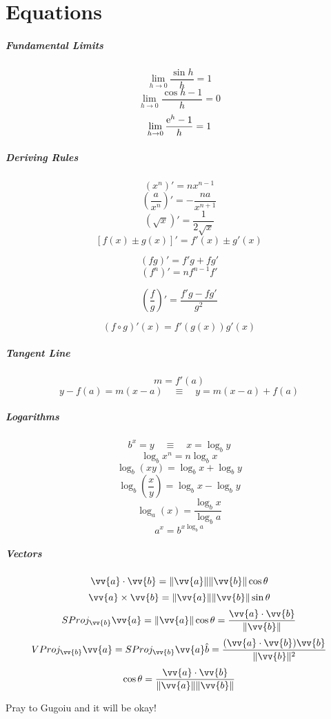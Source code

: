 \chapter{Equations}
	\paragraph{Fundamental Limits}
		\[\lim_{h \to 0} \frac{\sin h}{h} = 1\]
		\[\lim_{h \to 0} \frac{\cos h - 1}{h} = 0\]
		\[\lim_{h \to 0} \frac{\mathrm{e}^h - 1}{h} = 1\]
	\paragraph{Deriving Rules}
		\[(x^n)' = nx^{n-1}\]
		\[\left(\frac{a}{x^n}\right)' = -\frac{na}{x^{n+1}}\]
		\[(\sqrt{x})' = \frac{1}{2\sqrt{x}}\]
		\[[f(x) \pm g(x)]' = f'(x) \pm g'(x)\]

		\[(fg)' = f'g + fg'\]
		\[(f^n)' = nf^{n-1}f'\]

		\[\left(\frac{f}{g}\right)' = \frac{f'g - fg'}{g^2}\]

		\[(f \circ g)'(x) = f'(g(x))g'(x)\]
	\paragraph{Tangent Line}
		\[m = f'(a)\]
		\[y - f(a) = m(x-a) \quad \equiv \quad y = m(x-a) + f(a)\]
	\paragraph{Logarithms}
		\[b^x = y \quad \equiv \quad x = \log_b y\]
		\[\log_b x^n = n\log_b x\]
		\[\log_b(xy) = \log_b x + \log_b y\]
		\[\log_b\left(\frac{x}{y}\right) = \log_b x - \log_b y\]
		\[\log_a(x) = \frac{\log_b x}{\log_b a}\]
		\[a^x = b^{x\log_b a}\]
	\paragraph{Vectors}
		\[\vv{a} \cdot \vv{b} = \|\vv{a}\|\|\vv{b}\|\cos\theta\]
		\[\vv{a} \times \vv{b} = \|\vv{a}\|\|\vv{b}\|\sin\theta\]
		\[SProj_{\vv{b}}\vv{a} = \|\vv{a}\|\cos\theta = \frac{\vv{a} \cdot \vv{b}}{\|\vv{b}\|}\]
		\[VProj_{\vv{b}}\vv{a} = SProj_{\vv{b}}\vv{a}\hat{b} = \frac{(\vv{a} \cdot \vv{b})\vv{b}}{\|\vv{b}\|^2}\]
		\[\cos\theta = \frac{\vv{a}\cdot\vv{b}}{\|\vv{a}\|\|\vv{b}\|}\]
	\vspace{2cm}
	\begin{center}
		\Huge
		Pray to Gugoiu and it will be okay!
	\end{center}
